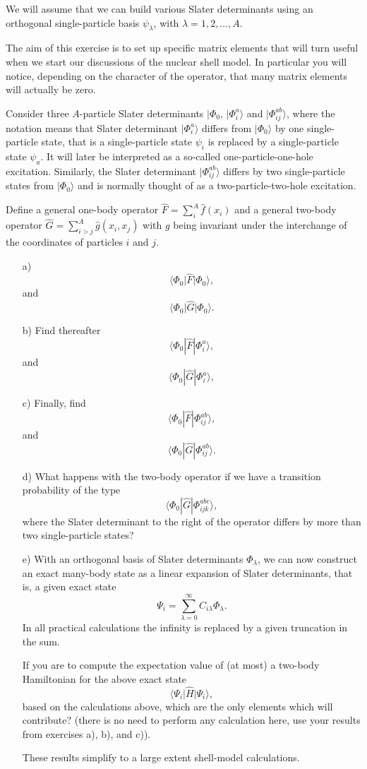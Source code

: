 \begin{prob}
We will assume that we can build various Slater determinants using an orthogonal  single-particle basis $\psi_{\lambda}$, 
with $\lambda = 1,2,\dots,A$. 


The aim of this exercise is to set up specific matrix elements that will turn useful when we start our discussions of the nuclear shell model. In particular you will notice, depending on the character of the operator, that many matrix elements will actually be zero.

Consider three $A$-particle  Slater determinants  $|\Phi_0$, $|\Phi_i^a\rangle$ and $|\Phi_{ij}^{ab}\rangle$, where the notation means that 
Slater determinant $|\Phi_i^a\rangle$ differs from $|\Phi_0\rangle$ by one single-particle state, that is a single-particle
state $\psi_i$ is replaced by a single-particle state $\psi_a$. 
It will later be interpreted as a so-called one-particle-one-hole excitation.
Similarly, the Slater determinant $|\Phi_{ij}^{ab}\rangle$
differs by two single-particle states from $|\Phi_0\rangle$ and is normally thought of as a two-particle-two-hole excitation.

Define a general one-body operator $\hat{F} = \sum_{i}^A\hat{f}(x_{i})$ and a general  two-body operator $\hat{G}=\sum_{i>j}^A\hat{g}(x_{i},x_{j})$ with $g$ being invariant under the interchange of the coordinates of particles $i$ and $j$. 
\begin{enumerate}
\item[a)]
\[
\langle \Phi_0 \vert\hat{F}\vert\Phi_0\rangle,
\]
and
\[
\langle \Phi_0\vert\hat{G}|\Phi_0\rangle.
\]
\item[b)]
Find thereafter 
\[
\langle \Phi_0 |\hat{F}|\Phi_i^a\rangle,
\]
and
\[
\langle \Phi_0|\hat{G}|\Phi_i^a\rangle,
\]
\item[c)]
Finally, find
\[
\langle \Phi_0 |\hat{F}|\Phi_{ij}^{ab}\rangle,
\]
and
\[
\langle \Phi_0|\hat{G}|\Phi_{ij}^{ab}\rangle.
\]
\item[d)]
What happens with the two-body operator if we have a transition probability  of the type
\[
\langle \Phi_0|\hat{G}|\Phi_{ijk}^{abc}\rangle,
\]
where the Slater determinant to the right of the operator differs by more than two single-particle states?
\item[e)]
With an orthogonal basis of Slater determinants $\Phi_{\lambda}$, we can now construct an exact many-body state as a linear expansion of Slater determinants, that is, a given exact state
\[
\Psi_i = \sum_{\lambda =0}^{\infty}C_{i\lambda}\Phi_{\lambda}.
\]
In all practical calculations the infinity is replaced by a given truncation in the sum. 

If you are to compute the expectation value of (at most) a two-body Hamiltonian for the above
exact state
\[
\langle \Psi_i \vert \hat{H} \vert \Psi_i\rangle,
\]
based on the calculations above, which are the only elements which will contribute?  (there is no need to perform any calculation here, use your results from exercises a), b), and c)).

These results simplify to a large extent shell-model calculations. 
\end{enumerate}
\end{prob}




